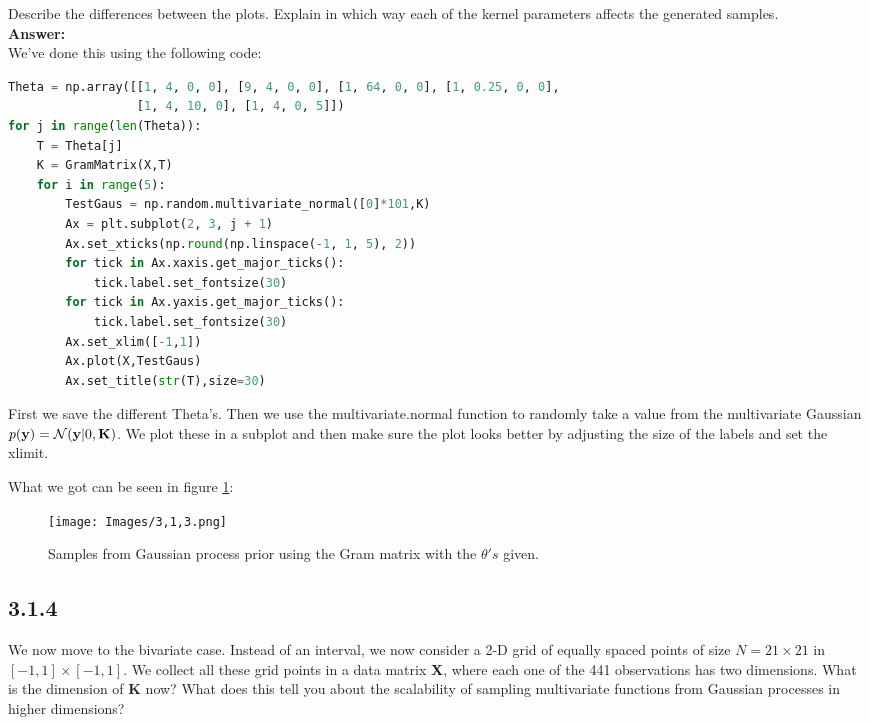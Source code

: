 \documentclass[a4paper]{article}
\begin{document}
Describe the differences between the plots. Explain in which way each of the kernel parameters affects the generated samples.\\


\textbf{Answer:}\\


We've done this using the following code:


\begin{lstlisting}[language=Python]
Theta = np.array([[1, 4, 0, 0], [9, 4, 0, 0], [1, 64, 0, 0], [1, 0.25, 0, 0],
                  [1, 4, 10, 0], [1, 4, 0, 5]])
for j in range(len(Theta)):
    T = Theta[j]
    K = GramMatrix(X,T) 
    for i in range(5):
        TestGaus = np.random.multivariate_normal([0]*101,K)
        Ax = plt.subplot(2, 3, j + 1)
        Ax.set_xticks(np.round(np.linspace(-1, 1, 5), 2))
        for tick in Ax.xaxis.get_major_ticks():
            tick.label.set_fontsize(30)
        for tick in Ax.yaxis.get_major_ticks():
            tick.label.set_fontsize(30)
        Ax.set_xlim([-1,1])
        Ax.plot(X,TestGaus)
        Ax.set_title(str(T),size=30)
\end{lstlisting}

First we save the different Theta's. Then we use the multivariate.normal function to randomly take a value from the multivariate Gaussian $p(\textbf y) = \mathcal N (\textbf y | 0,\textbf K)$. We plot these in a subplot and then make sure the plot looks better by adjusting the size of the labels and set the xlimit.

What we got can be seen in figure \ref{3.1.3}:

\begin{figure}[H]
\texttt{[image: Images/3,1,3.png]}
\caption{Samples from Gaussian process prior using the Gram matrix with the $\theta's$ given.}
\label{3.1.3}
\end{figure}

\subsection*{3.1.4}

We now move to the bivariate case. Instead of an interval, we now consider a 2-D grid of equally spaced points of size $N = 21 \times 21$ in $[-1,1] \times [-1,1]$. We collect all these grid points in a data matrix \textbf{X}, where each one of the 441 observations has two dimensions. What is the dimension of \textbf{K} now? What does this tell you about the scalability of sampling multivariate functions from Gaussian processes in higher dimensions?\\
\end{document}
